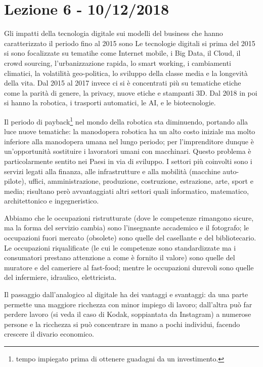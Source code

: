 \documentclass[a4page, 11pt]{article}
\begin{document}
\section*{Lezione 6 - 10/12/2018}
Gli impatti della tecnologia digitale sui modelli del business che hanno caratterizzato il periodo fino al 2015 sono
Le tecnologie digitali si prima del 2015 si sono focalizzate su tematihe come Internet mobile, i Big Data, il Cloud, il crowd sourcing, l'urbanizzazione rapida, lo smart working, i cambiamenti climatici, la volatilità geo-politica, lo sviluppo della classe media e la longevità della vita.
Dal 2015 al 2017 invece ci si è concentrati più su tematiche etiche come la parità di genere, la privacy, nuove etiche e stampanti 3D.
Dal 2018 in poi si hanno la robotica, i trasporti automatici, le AI, e le biotecnologie.

Il periodo di payback\footnote{tempo impiegato prima di ottenere guadagni da un investimento.} nel mondo della robotica sta diminuendo, portando alla luce nuove tematiche: la manodopera robotica ha un alto costo iniziale ma molto inferiore alla manodopera umana nel lungo periodo; per l'imprenditore dunque è un'opportunità sostituire i lavoratori umani con macchinari.
Questo problema è particolarmente sentito nei Paesi in via di sviluppo.
I settori più coinvolti sono i servizi legati alla finanza, alle infrastrutture e alla mobilità (macchine auto-pilote), uffici, amministrazione, produzione, costruzione, estrazione, arte, sport e media; risultano però avvantaggiati altri settori quali informatico, matematico, architettonico e ingegneristico.

Abbiamo che le occupazioni ristrutturate (dove le competenze rimangono sicure, ma la forma del servizio cambia) sono l'insegnante accademico e il fotografo; le occupazioni fuori mercato (obsolete) sono quelle del casellante e del bibliotecario.
Le occupazioni riqualificate (le cui le competenze sono standardizzate ma i consumatori prestano attenzione a come è fornito il valore) sono quelle del muratore e del cameriere al fast-food; mentre le occupazioni durevoli sono quelle del infermiere, idraulico, elettricista.

Il passaggio dall'analogico al digitale ha dei vantaggi e svantaggi: da una parte permette una maggiore ricchezza con minor impiego di lavoro; dall'altra può far perdere lavoro (si veda il caso di Kodak, soppiantata da Instagram) a numerose persone e la ricchezza si può concentrare in mano a pochi individui, facendo crescere il divario economico.
%
	 
\end{document}
